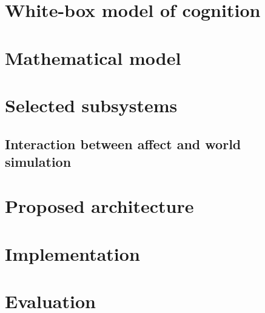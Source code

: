 \documentclass[bibliography=totoc ]{scrartcl}
\begin{document}


\section{White-box model of cognition}\label{sec:schemaOfCognition}



\section{Mathematical model}\label{sec:mathematicalModel}



\section{Selected subsystems}\label{sec:selectedSubsystems}



\subsection{Interaction between affect and world simulation}



\section{Proposed architecture}\label{sec:proposedArchitecture}

\section{Implementation}\label{sec:implementation}



\section{Evaluation}


\endgroup

\pagebreak

\nocite{*}



\end{document}
